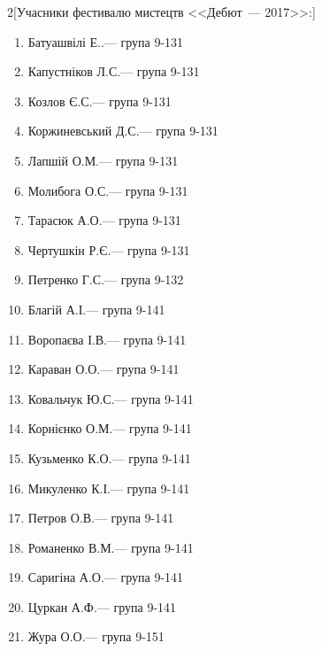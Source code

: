 \documentclass[
	a4paper,
	12pt,
	oneside,
	draft
]{extreport}
\begin{document}
{\begin{enumerate}[label=\Roman*.]
\begin{multicols}{2}[Учасники фестивалю мистецтв <<Дебют~--- 2017>>:]
\begin{enumerate}[topsep=0pt,itemsep=-1ex,partopsep=1ex,parsep=1ex,label=\arabic*.]
\item Батуашвілі Е..\hfill --- група 9-131
\item Капустніков Л.С.\hfill --- група 9-131
\item Козлов Є.С.\hfill --- група 9-131
\item Коржиневський Д.С.\hfill --- група 9-131
\item Лапшій О.М.\hfill --- група 9-131
\item Молибога О.С.\hfill --- група 9-131
\item Тарасюк А.О.\hfill --- група 9-131
\item Чертушкін Р.Є.\hfill --- група 9-131
\item Петренко Г.С.\hfill --- група 9-132
\item Благій А.І.\hfill --- група 9-141
\item Воропаєва І.В.\hfill --- група 9-141
\item Караван О.О.\hfill --- група 9-141
\item Ковальчук Ю.С.\hfill --- група 9-141
\item Корнієнко О.М.\hfill --- група 9-141
\item Кузьменко К.О.\hfill --- група 9-141
\item Микуленко К.І.\hfill --- група 9-141
\item Петров О.В.\hfill --- група 9-141
\item Романенко В.М.\hfill --- група 9-141
\item Саригіна А.О.\hfill --- група 9-141
\item Цуркан А.Ф.\hfill --- група 9-141
\item Жура О.О.\hfill --- група 9-151
\end{enumerate}
\end{multicols}



\end{enumerate}}
\end{document}
